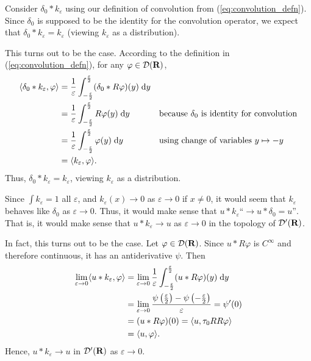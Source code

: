 \documentclass{homework}
\begin{document}
	\question Consider $\delta_0 * k_\varepsilon$ using our definition of convolution from (\ref{eq:convolution_defn}). Since $\delta_0$ is supposed to be the identity for the convolution operator, we expect that $\delta_0 * k_\varepsilon = k_\varepsilon$ (viewing $k_\varepsilon$ as a distribution).
	
	This turns out to be the case. According to the definition in (\ref{eq:convolution_defn}), for any $\varphi \in \mathcal{D}(\textnormal{\bf R})$,
	\begin{align}
		\langle\delta_0 * k_\varepsilon, \varphi\rangle &= \frac{1}{\varepsilon}\int_{-\frac{\varepsilon}{2}}^\frac{\varepsilon}{2} (\delta_0 * R\varphi)(y)\;\text{d} y &&\\
		&= \frac{1}{\varepsilon}\int_{-\frac{\varepsilon}{2}}^\frac{\varepsilon}{2} R\varphi(y)\;\text{d} y  && \text{because $\delta_0$ is identity for convolution}\\
		&= \frac{1}{\varepsilon}\int_{-\frac{\varepsilon}{2}}^\frac{\varepsilon}{2}  \varphi(y)\;\text{d} y && \text{using change of variables $y\mapsto -y$}\\
		&= \langle k_\varepsilon, \varphi \rangle.
	\end{align}
	Thus, $\delta_0 * k_\varepsilon = k_\varepsilon$, viewing $k_\varepsilon$ as a distribution.
	
	\question Since $\int k_\varepsilon = 1$ all $\varepsilon$, and $k_\varepsilon(x) \to 0$ as $\varepsilon \to 0$ if $x \ne 0$, it would seem that $k_\varepsilon$ behaves like $\delta_0$ as $\varepsilon \to 0$. Thus, it would make sense that $u * k_\varepsilon \text{``} \to u * \delta_0 = u\text{''}$. That is, it would make sense that $u * k_\varepsilon \to u$ as $\varepsilon \to 0$ in the topology of $\mathcal{D}'(\textnormal{\bf R})$.
	
	In fact, this turns out to be the case. Let $\varphi \in \mathcal{D}(\textnormal{\bf R})$. Since $u*R\varphi$ is $C^\infty$ and therefore continuous, it has an antiderivative $\psi$. Then
	\begin{align}
		\lim_{\varepsilon \to 0} \langle u * k_\varepsilon, \varphi\rangle &= \lim_{\varepsilon\to 0}\frac{1}{\varepsilon}\int_{-\frac{\varepsilon}{2}}^\frac{\varepsilon}{2} (u * R\varphi)(y)\;\text{d} y \\
		&= \lim_{\varepsilon \to 0} \frac{\psi\left(\frac{\varepsilon}{2}\right) - \psi\left(-\frac{\varepsilon}{2}\right)}{\varepsilon} = \psi'(0) \\
		&= (u * R\varphi)(0) = \langle u, \tau_0RR\varphi\rangle \\
		&= \langle u, \varphi \rangle.
	\end{align}
	Hence, $u * k_\varepsilon \to u$ in $\mathcal{D}'(\textnormal{\bf R})$ as $\varepsilon \to 0$.
	
\end{document}
